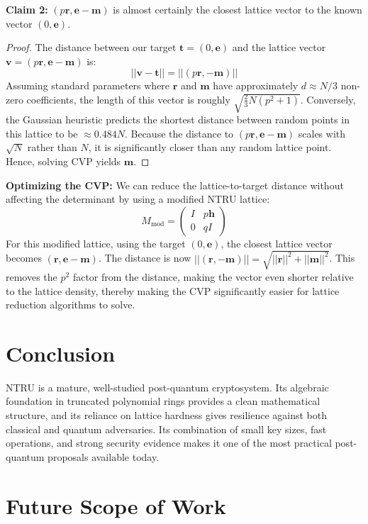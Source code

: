 \documentclass[12pt, a4paper]{article}
\theoremstyle{definition}
\theoremstyle{plain}
\begin{document}
\textbf{Claim 2:} $(p\mathbf{r}, \mathbf{e} - \mathbf{m})$ is almost certainly the closest lattice vector to the known vector $(0, \mathbf{e})$.
\begin{proof}
The distance between our target $\mathbf{t} = (0, \mathbf{e})$ and the lattice vector $\mathbf{v} = (p\mathbf{r}, \mathbf{e} - \mathbf{m})$ is:
\[
||\mathbf{v} - \mathbf{t}|| = ||(p\mathbf{r}, -\mathbf{m})||
\]
Assuming standard parameters where $\mathbf{r}$ and $\mathbf{m}$ have approximately $d \approx N/3$ non-zero coefficients, the length of this vector is roughly $\sqrt{\frac{2}{3}N(p^2 + 1)}$.
Conversely, the Gaussian heuristic predicts the shortest distance between random points in this lattice to be $\approx 0.484N$. Because the distance to $(p\mathbf{r}, \mathbf{e}-\mathbf{m})$ scales with $\sqrt{N}$ rather than $N$, it is significantly closer than any random lattice point. Hence, solving CVP yields $\mathbf{m}$.
\end{proof}

\textbf{Optimizing the CVP:} We can reduce the lattice-to-target distance without affecting the determinant by using a modified NTRU lattice:
\[
M_{\text{mod}} = \begin{pmatrix} I & p\mathbf{h} \\ 0 & qI \end{pmatrix}
\]
For this modified lattice, using the target $(0, \mathbf{e})$, the closest lattice vector becomes $(\mathbf{r}, \mathbf{e} - \mathbf{m})$. The distance is now $||(\mathbf{r}, -\mathbf{m})|| = \sqrt{||\mathbf{r}||^2 + ||\mathbf{m}||^2}$. This removes the $p^2$ factor from the distance, making the vector even shorter relative to the lattice density, thereby making the CVP significantly easier for lattice reduction algorithms to solve.

\section{Conclusion}

NTRU is a mature, well-studied post-quantum cryptosystem. Its algebraic
foundation in truncated polynomial rings provides a clean mathematical
structure, and its reliance on lattice hardness gives resilience against both
classical and quantum adversaries. Its combination of small key sizes, fast
operations, and strong security evidence makes it one of the most practical
post-quantum proposals available today.

\section{Future Scope of Work}
\end{document}
